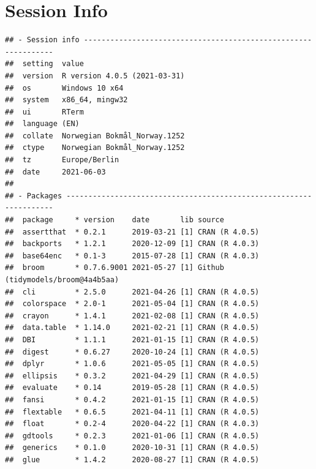 \documentclass[
  11pt,
]{article}
\begin{document}
\clearpage

\clearpage

\hypertarget{session-info}{%
\section*{Session Info}\label{session-info}}

\begin{verbatim}
## - Session info ---------------------------------------------------------------
##  setting  value                       
##  version  R version 4.0.5 (2021-03-31)
##  os       Windows 10 x64              
##  system   x86_64, mingw32             
##  ui       RTerm                       
##  language (EN)                        
##  collate  Norwegian Bokmål_Norway.1252
##  ctype    Norwegian Bokmål_Norway.1252
##  tz       Europe/Berlin               
##  date     2021-06-03                  
## 
## - Packages -------------------------------------------------------------------
##  package     * version    date       lib source                           
##  assertthat  * 0.2.1      2019-03-21 [1] CRAN (R 4.0.5)                   
##  backports   * 1.2.1      2020-12-09 [1] CRAN (R 4.0.3)                   
##  base64enc   * 0.1-3      2015-07-28 [1] CRAN (R 4.0.3)                   
##  broom       * 0.7.6.9001 2021-05-27 [1] Github (tidymodels/broom@4a4b5aa)
##  cli         * 2.5.0      2021-04-26 [1] CRAN (R 4.0.5)                   
##  colorspace  * 2.0-1      2021-05-04 [1] CRAN (R 4.0.5)                   
##  crayon      * 1.4.1      2021-02-08 [1] CRAN (R 4.0.5)                   
##  data.table  * 1.14.0     2021-02-21 [1] CRAN (R 4.0.5)                   
##  DBI         * 1.1.1      2021-01-15 [1] CRAN (R 4.0.5)                   
##  digest      * 0.6.27     2020-10-24 [1] CRAN (R 4.0.5)                   
##  dplyr       * 1.0.6      2021-05-05 [1] CRAN (R 4.0.5)                   
##  ellipsis    * 0.3.2      2021-04-29 [1] CRAN (R 4.0.5)                   
##  evaluate    * 0.14       2019-05-28 [1] CRAN (R 4.0.5)                   
##  fansi       * 0.4.2      2021-01-15 [1] CRAN (R 4.0.5)                   
##  flextable   * 0.6.5      2021-04-11 [1] CRAN (R 4.0.5)                   
##  float       * 0.2-4      2020-04-22 [1] CRAN (R 4.0.3)                   
##  gdtools     * 0.2.3      2021-01-06 [1] CRAN (R 4.0.5)                   
##  generics    * 0.1.0      2020-10-31 [1] CRAN (R 4.0.5)                   
##  glue        * 1.4.2      2020-08-27 [1] CRAN (R 4.0.5)                   

\end{verbatim}
\end{document}

